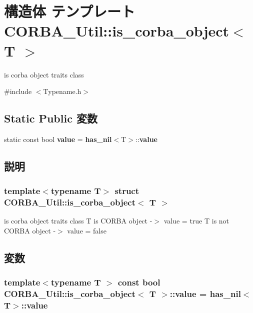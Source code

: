 \section{構造体 テンプレート CORBA\_\-Util::is\_\-corba\_\-object$<$ T $>$}
\label{structCORBA__Util_1_1is__corba__object}


is corba object traits class  




{\ttfamily \#include $<$Typename.h$>$}

\subsection*{Static Public 変数}
\begin{DoxyCompactItemize}
\item 
static const bool {\bf value} = {\bf has\_\-nil}$<$T$>$::{\bf value}
\end{DoxyCompactItemize}


\subsection{説明}
\subsubsection*{template$<$typename T$>$ struct CORBA\_\-Util::is\_\-corba\_\-object$<$ T $>$}

is corba object traits class T is CORBA object -\/$>$ value = true T is not CORBA object -\/$>$ value = false 

\subsection{変数}
\subsubsection[{value}]{\setlength{\rightskip}{0pt plus 5cm}template$<$typename T $>$ const bool {\bf CORBA\_\-Util::is\_\-corba\_\-object}$<$ T $>$::{\bf value} = {\bf has\_\-nil}$<$T$>$::{\bf value}\hspace{0.3cm}{\ttfamily  [static]}}\label{structCORBA__Util_1_1is__corba__object_a1ca9ab7460b29624bb71bf2a0b3e7a24}
